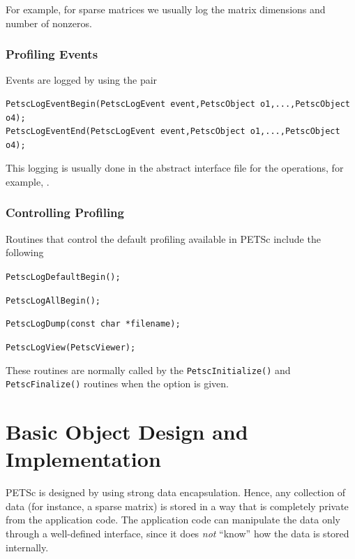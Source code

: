 For example, for sparse matrices we usually log the matrix
dimensions and number of nonzeros.

\subsection{Profiling Events}

Events are logged by using the
pair
\begin{lstlisting}
PetscLogEventBegin(PetscLogEvent event,PetscObject o1,...,PetscObject o4);
PetscLogEventEnd(PetscLogEvent event,PetscObject o1,...,PetscObject o4);
\end{lstlisting}
This logging is usually done in the abstract
interface file for the operations, for example, \href{http://www.mcs.anl.gov/petsc/petsc-master/src/mat/interface/matrix.c.html}{}.

\subsection{Controlling Profiling}

Routines that control the default profiling available in PETSc include the following
\begin{tightitemize}
  \item\lstinline{PetscLogDefaultBegin();}
  \item\lstinline{PetscLogAllBegin();}
  \item\lstinline{PetscLogDump(const char *filename);}
  \item\lstinline{PetscLogView(PetscViewer);}
\end{tightitemize}
These routines are normally called by the \lstinline{PetscInitialize()}
and \lstinline{PetscFinalize()} routines when the option
 is given.

\chapter{Basic Object Design and Implementation}
\label{chapter:design}

PETSc is designed by using strong data encapsulation.  Hence,
any collection of data (for instance, a sparse matrix) is stored in
a way that is completely private from the application code. The application
code can manipulate the data only through a well-defined interface, since it
does {\em not} ``know'' how the data is stored internally.

